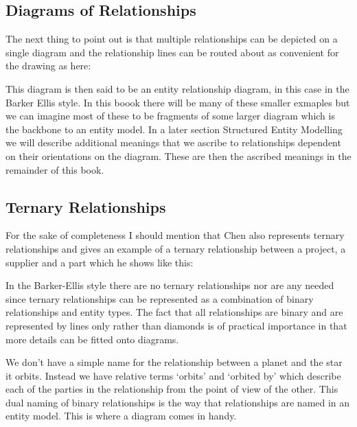 \subsection*{Diagrams of Relationships}
The next thing to point out is that multiple relationships can be depicted on a single diagram and the relationship lines can be routed about as convenient for the drawing as here:
\begin{center}

\end{center}

This diagram is then said to be an entity relationship diagram, in this case in the Barker Ellis style. In this boook there will be many of these smaller exmaples but we can imagine most of these to be fragments of some larger diagram which is the backbone to an entity model.
In a later section Structured Entity Modelling we will describe additional meanings that we ascribe to relationships dependent on their orientations on the diagram. These are then the ascribed meanings in the remainder of this book. 

\subsection*{Ternary Relationships}
For the sake of completeness I should mention that Chen also represents ternary relationships and gives an 
example of a ternary relationship between a project, a supplier and a part which he shows like this:


\begin{center}
\scalebox{0.9}{}
\end{center}

In the Barker-Ellis style there are no ternary relationships nor are any needed since ternary relationships can be represented as a combination of binary relationships and entity types. The fact that all relationships are binary and are represented by lines only rather than diamonds  is of practical importance in that more details can be fitted onto diagrams.

\mynote 
We don't have a simple name for the relationship between a planet and the star it orbits. Instead we have  relative terms `orbits' and `orbited by' which describe each of the parties in the relationship from the point of view of the other. This dual naming of binary relationships is the way that relationships are named in an entity model. 
This is where a diagram comes in handy. 